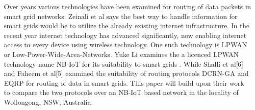 Over years various technologies have been examined for routing of data packets in smart grid networks\citep{RN13,RN14,RN8,RN17}. Zeinali et al\citep{RN9} says the best way to handle information for smart grids would be to utilize the already existing internet infrastructure. In the recent year internet technology has advanced significantly, now enabling internet access to every device using wireless technology. One such technology is LPWAN or Low-Power-Wide-Area-Networks\citep{RN20}. Yuke Li examines the a licenced LPWAN technology name NB-IoT for its suitability to smart grids \citep{RN20}. While Shalli et al\citep{RN8}[6] and Faheem et al\citep{RN14}[5] examined the suitability of routing protocols DCRN-GA and EQRP for routing of data in smart grids. This paper will build upon their work to compare the two protocols over an NB-IoT based network in the locality of Wollongong, NSW, Australia.
